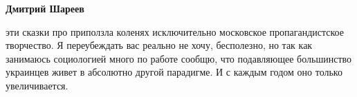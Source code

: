 \begin{itemize}
\begin{itemize}
\textbf{Дмитрий Шареев} 

эти сказки про приползла коленях исключительно московское пропагандистское
творчество. Я переубеждать вас реально не хочу, бесполезно, но так как
занимаюсь социологией много по работе сообщю, что подавляющее большинство
украинцев живет в абсолютно другой парадигме. И с каждым годом оно только
увеличивается.

\end{itemize} %

\end{itemize} %
